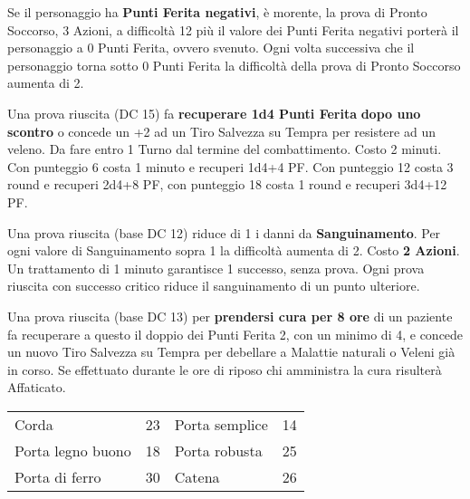 \documentclass[landscape,10pt,a4paper]{article}
\begin{document}
\begin{multicols}{3}
\begin{dmbox}[title=Pronto Soccorso - pagina \pageref{prontosoccorso}]
Se il personaggio ha \textbf{Punti Ferita negativi}, è morente, la prova di Pronto Soccorso, 3 Azioni, a difficoltà 12 più il valore dei Punti Ferita negativi porterà il personaggio a 0 Punti Ferita, ovvero svenuto. Ogni volta successiva che il personaggio torna sotto 0 Punti Ferita la difficoltà della prova di Pronto Soccorso aumenta di 2.

Una prova riuscita (DC 15) fa \textbf{recuperare 1d4 Punti Ferita} \textbf{dopo uno scontro} o concede un +2 ad un Tiro Salvezza su Tempra per resistere ad un veleno. Da fare entro 1 Turno dal termine del combattimento.  Costo 2 minuti.
Con punteggio 6 costa 1 minuto e recuperi 1d4+4 PF. Con punteggio 12 costa 3 round e recuperi 2d4+8 PF, con punteggio 18 costa 1 round e recuperi 3d4+12 PF.

Una prova riuscita (base DC 12) riduce di 1 i danni da \textbf{Sanguinamento}. Per ogni valore di Sanguinamento sopra 1 la difficoltà aumenta di 2. Costo \textbf{2 Azioni}.
Un trattamento di 1 minuto garantisce 1 successo, senza prova. Ogni prova riuscita con successo critico riduce il sanguinamento di un punto ulteriore.

Una prova riuscita (base DC 13) per \textbf{prendersi cura per 8 ore} di un paziente fa recuperare a questo il doppio dei Punti Ferita 2, con un minimo di 4, e concede un nuovo Tiro Salvezza su Tempra per debellare a Malattie naturali o Veleni già in corso.
Se effettuato durante le ore di riposo chi amministra la cura risulterà Affaticato.
\end{dmbox}

\begin{dmbox}[title=Rompere Oggetti - DC Forzai]	
	\begin{tabular}{ll|ll}
		Corda      & 23&Porta semplice         & 14\\
		Porta legno buono  & 18&Porta robusta          & 25\\
		Porta di ferro     & 30&Catena                 & 26 \\
	\end{tabular}
\end{dmbox}


\begin{dmbox}[title=Sfondare le Porte - pagina \pageref{tabellaporte}]
\noindent	{}
\end{dmbox}
\end{multicols}
\end{document}
